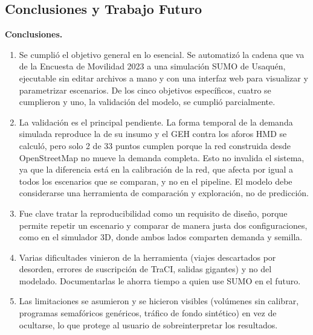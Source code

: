 \subsection{Conclusiones y Trabajo Futuro}

\textbf{Conclusiones.}
\begin{enumerate}[noitemsep]
    \item Se cumplió el objetivo general en lo esencial. Se automatizó la cadena que va de la Encuesta de Movilidad 2023 a una simulación SUMO de Usaquén, ejecutable sin editar archivos a mano y con una interfaz web para visualizar y parametrizar escenarios. De los cinco objetivos específicos, cuatro se cumplieron y uno, la validación del modelo, se cumplió parcialmente.
    \item La validación es el principal pendiente. La forma temporal de la demanda simulada reproduce la de su insumo y el GEH contra los aforos HMD se calculó, pero solo 2 de 33 puntos cumplen porque la red construida desde OpenStreetMap no mueve la demanda completa. Esto no invalida el sistema, ya que la diferencia está en la calibración de la red, que afecta por igual a todos los escenarios que se comparan, y no en el pipeline. El modelo debe considerarse una herramienta de comparación y exploración, no de predicción.
    \item Fue clave tratar la reproducibilidad como un requisito de diseño, porque permite repetir un escenario y comparar de manera justa dos configuraciones, como en el simulador 3D, donde ambos lados comparten demanda y semilla.
    \item Varias dificultades vinieron de la herramienta (viajes descartados por desorden, errores de suscripción de TraCI, salidas gigantes) y no del modelado. Documentarlas le ahorra tiempo a quien use SUMO en el futuro.
    \item Las limitaciones se asumieron y se hicieron visibles (volúmenes sin calibrar, programas semafóricos genéricos, tráfico de fondo sintético) en vez de ocultarse, lo que protege al usuario de sobreinterpretar los resultados.
\end{enumerate}

